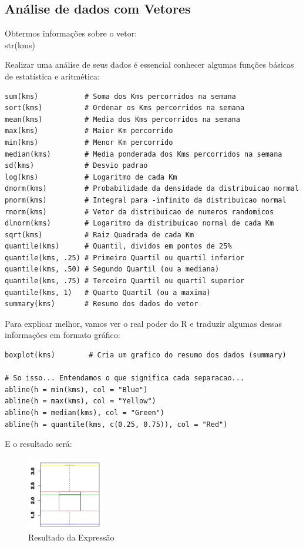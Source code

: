 \documentclass[a4paper,11pt]{article}
\begin{document}
\subsection{Análise de dados com Vetores}
Obtermos informações sobre o vetor: \\
{\ttfamily str(kms)}

Realizar uma análise de seus dados é essencial conhecer algumas funções básicas de estatística e aritmética:
\begin{lstlisting}
sum(kms)           # Soma dos Kms percorridos na semana
sort(kms)          # Ordenar os Kms percorridos na semana
mean(kms)          # Media dos Kms percorridos na semana
max(kms)           # Maior Km percorrido
min(kms)           # Menor Km percorrido
median(kms)        # Media ponderada dos Kms percorridos na semana
sd(kms)            # Desvio padrao
log(kms)           # Logaritmo de cada Km
dnorm(kms)         # Probabilidade da densidade da distribuicao normal
pnorm(kms)         # Integral para -infinito da distribuicao normal
rnorm(kms)         # Vetor da distribuicao de numeros randomicos
dlnorm(kms)        # Logaritmo da distribuicao normal de cada Km
sqrt(kms)          # Raiz Quadrada de cada Km
quantile(kms)      # Quantil, dividos em pontos de 25%
quantile(kms, .25) # Primeiro Quartil ou quartil inferior
quantile(kms, .50) # Segundo Quartil (ou a mediana)
quantile(kms, .75) # Terceiro Quartil ou quartil superior
quantile(kms, 1)   # Quarto Quartil (ou a maxima)
summary(kms)       # Resumo dos dados do vetor
\end{lstlisting}

Para explicar melhor, vamos ver o real poder do R e traduzir algumas dessas informações em formato gráfico:
\begin{lstlisting}
boxplot(kms)        # Cria um grafico do resumo dos dados (summary)

# So isso... Entendamos o que significa cada separacao...
abline(h = min(kms), col = "Blue")
abline(h = max(kms), col = "Yellow")
abline(h = median(kms), col = "Green")
abline(h = quantile(kms, c(0.25, 0.75)), col = "Red")
\end{lstlisting}

E o resultado será:
\begin{figure}[H]
	\centering
	\includegraphics[width=0.3\textwidth]{imagens/grafico01.png}
	\caption{Resultado da Expressão}
\end{figure}
\end{document}
